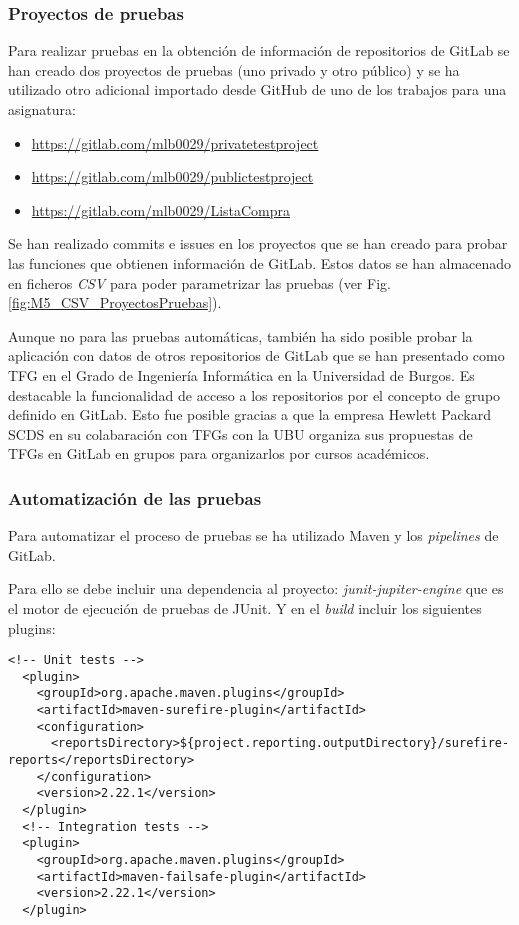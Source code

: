 \subsubsection{Proyectos de pruebas}

Para realizar pruebas en la obtención de información de repositorios de GitLab se han creado dos proyectos de pruebas (uno privado y otro público) y se ha utilizado otro adicional importado desde GitHub de uno de los trabajos para una asignatura:
\begin{itemize}
	\tightlist
	\item \url{https://gitlab.com/mlb0029/privatetestproject}
	\item \url{https://gitlab.com/mlb0029/publictestproject}
	\item \url{https://gitlab.com/mlb0029/ListaCompra}
\end{itemize}
Se han realizado commits e issues en los proyectos que se han creado para probar las funciones que obtienen información de GitLab. Estos datos se han almacenado en ficheros \textit{CSV} para poder parametrizar las pruebas (ver Fig. \ref{fig:M5_CSV_ProyectosPruebas}).


Aunque no para las pruebas automáticas, también ha sido posible probar la aplicación con datos de otros repositorios de GitLab que se han presentado como TFG en el Grado de Ingeniería Informática en la Universidad de Burgos. Es destacable la funcionalidad de acceso a los repositorios por el concepto de grupo definido en GitLab. Esto fue posible gracias a que la empresa Hewlett Packard SCDS en su colabaración con TFGs con la UBU organiza sus propuestas de TFGs en GitLab en grupos para organizarlos por cursos académicos.

\subsubsection{Automatización de las pruebas}

Para automatizar el proceso de pruebas se ha utilizado Maven y los \textit{pipelines} de GitLab.

Para ello se debe incluir una dependencia al proyecto: \textit{junit-jupiter-engine} que es el motor de ejecución de pruebas de JUnit. Y en el \textit{build} incluir los siguientes plugins:\\
\begin{minipage}{\linewidth}
{\tiny
\begin{lstlisting}[breaklines]
  <!-- Unit tests -->
  <plugin>
	<groupId>org.apache.maven.plugins</groupId>
	<artifactId>maven-surefire-plugin</artifactId>
	<configuration>
	  <reportsDirectory>${project.reporting.outputDirectory}/surefire-reports</reportsDirectory>
	</configuration>
	<version>2.22.1</version>
  </plugin>
  <!-- Integration tests -->
  <plugin>
	<groupId>org.apache.maven.plugins</groupId>
	<artifactId>maven-failsafe-plugin</artifactId>
	<version>2.22.1</version>
  </plugin>	
\end{lstlisting}
}
\end{minipage}

